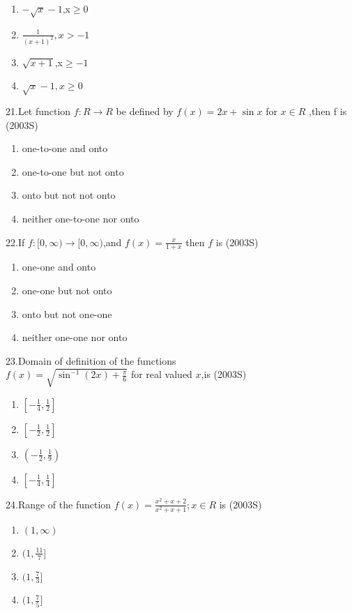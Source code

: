 \documentclass[journal,12pt,twocolumn]{IEEEtran}
\theoremstyle{remark}
\begin{document}
\begin{enumerate}
    \item $-\sqrt{x}-1$,x$\geq$0
    \item $\frac{1}{(x+1)^2},x>-1$
    \item $\sqrt{x+1}$,x$\geq -1$
    \item $\sqrt{x} -1,x\geq 0$
\end{enumerate}
21.Let function $f:R\rightarrow R$ be defined by $f(x)=2x + \sin x$ for $x \in R$ ,then f is
\hfill(2003S)\\
\begin{enumerate}
    \item one-to-one and onto
    \item one-to-one but not onto
    \item onto but not not onto
    \item neither one-to-one nor onto
\end{enumerate}
22.If $f:[0,\infty) \rightarrow [0,\infty)$,and $f(x)=\frac{x}{1+x}$ then $f$ is
\hfill(2003S)\\
\begin{enumerate}
    \item one-one and onto
    \item one-one but not onto
    \item onto but not one-one
    \item neither one-one nor onto
\end{enumerate}
23.Domain of definition of the functions\\ $f(x)=\sqrt{\sin^{-1}(2x)+\frac{\pi}{6}}$ for real valued $x$,is
\hfill(2003S)\\
\begin{enumerate}
    \item$\left[-\frac{1}{4},\frac{1}{2}\right]$\\
    \item$\left[-\frac{1}{2},\frac{1}{2}\right]$\\
    \item$\left(-\frac{1}{2},\frac{1}{9}\right)$\\
    \item$\left[-\frac{1}{4},\frac{1}{4}\right]$
\end{enumerate}
24.Range of the function $f(x)=\frac{x^2+x+2}{x^2+x+1};x\in R$ is
\hfill(2003S)\\
\begin{enumerate}
    \item $(1,\infty)$
    \item $(1,\frac{11}{7}]$
    \item $(1,\frac{7}{3}]$
    \item $(1,\frac{7}{5}]$
\end{enumerate}
\end{document}
